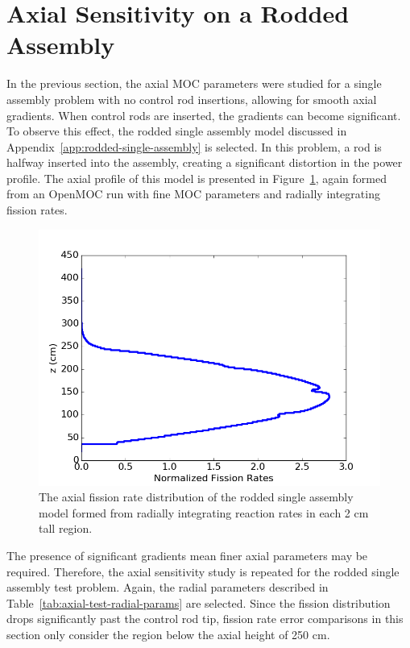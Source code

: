 \newpage
\section{Axial Sensitivity on a Rodded Assembly}
\label{sec:axial-sensitivity-rodded}

In the previous section, the axial \ac{MOC} parameters were studied for a single assembly problem with no control rod insertions, allowing for smooth axial gradients. When control rods are inserted, the gradients can become significant. To observe this effect, the rodded single assembly model discussed in Appendix~\ref{app:rodded-single-assembly} is selected. In this problem, a rod is halfway inserted into the assembly, creating a significant distortion in the power profile. The axial profile of this model is presented in Figure~\ref{fig:single-assembly-rodded-axial}, again formed from an OpenMOC run with fine \ac{MOC} parameters and radially integrating fission rates.

\begin{figure}[h!]
	\centering
	\includegraphics[width=0.7\linewidth]{figures/results/rr-plots/single-assembly-rodded-axial.png}
	\caption[]{The axial fission rate distribution of the rodded single assembly model formed from radially integrating reaction rates in each 2 cm tall region.}
	\label{fig:single-assembly-rodded-axial}
\end{figure}

The presence of significant gradients mean finer axial parameters may be required. Therefore, the axial sensitivity study is repeated for the rodded single assembly test problem. Again, the radial parameters described in Table~\ref{tab:axial-test-radial-params} are selected. Since the fission distribution drops significantly past the control rod tip, fission rate error comparisons in this section only consider the region below the axial height of 250 cm.

